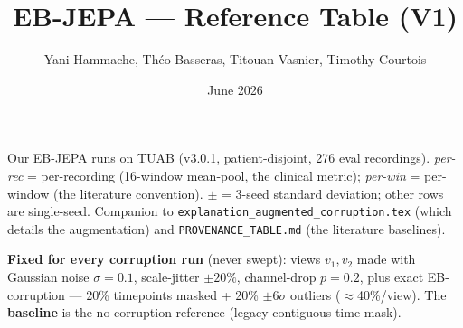 \documentclass[10pt,a4paper]{article}
\title{\textbf{EB-JEPA --- Reference Table (V1)}}
\author{Yani Hammache, Théo Basseras, Titouan Vasnier, Timothy Courtois}
\date{June 2026}
\begin{document}
\maketitle

\noindent Our EB-JEPA runs on TUAB (v3.0.1, patient-disjoint, 276 eval recordings).
\emph{per-rec} = per-recording (16-window mean-pool, the clinical metric); \emph{per-win} =
per-window (the literature convention). $\pm$ = 3-seed standard deviation; other rows are
single-seed. Companion to \texttt{explanation\_augmented\_corruption.tex} (which details the
augmentation) and \texttt{PROVENANCE\_TABLE.md} (the literature baselines).

\bigskip


\bigskip

\noindent\textbf{Fixed for every corruption run} (never swept): views $v_1,v_2$ made with Gaussian
noise $\sigma=0.1$, scale-jitter $\pm20\%$, channel-drop $p=0.2$, plus exact EB-corruption ---
20\% timepoints masked + 20\% $\pm6\sigma$ outliers ($\approx$40\%/view). The \textbf{baseline} is
the no-corruption reference (legacy contiguous time-mask).
\end{document}
